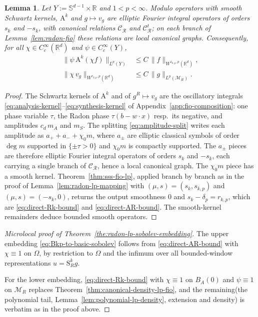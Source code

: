\documentclass[12pt]{article}
\numberwithin{equation}{section}
\newtheorem{lemma}{Lemma}[section]
\numberwithin{figure}{section}
\numberwithin{equation}{section}
\begin{document}
\begin{lemma}
\label{lem:inverse-fio-pair}
Let $Y:=\mathbb{S}^{d-1}\times\mathbb{R}$ and $1<p<\infty$.  Modulo operators with
smooth Schwartz kernels, $\mathrm{A}^k$ and $g\mapsto v_g$ are elliptic Fourier integral
operators of orders $s_k$ and $-s_k$, with canonical relations $\mathcal{C}_{\mathcal R}$
and $\mathcal{C}_{\mathcal R}^{t}$; on each branch of Lemma~\ref{lem:radon-fio} these
relations are local canonical graphs.  Consequently, for all
$\chi\in C_c^\infty(\mathbb{R}^d)$ and $\psi\in C_c^\infty(Y)$,
\begin{align}
    \|\psi\,\mathrm{A}^k(\chi f)\|_{L^p(Y)}
    &\le C\,\|f\|_{W^{s_{k,p},p}(\mathbb{R}^d)},
    \label{eq:direct-Rk-bound}\\
    \|\chi\,v_g\|_{W^{r_{k,p},p}(\mathbb{R}^d)}
    &\le C\,\|g\|_{L^p(\mathcal{M}_R)} .
    \label{eq:direct-AR-bound}
\end{align}
\end{lemma}
\begin{proof}
The Schwartz kernels of $\mathrm{A}^k$ and of $g^{R}\mapsto v_g$ are the oscillatory
integrals \eqref{eq:analysis-kernel}--\eqref{eq:synthesis-kernel} of
Appendix~\ref{app:fio-composition}: one phase variable $\tau$, the Radon phase
$\tau(b-w\cdot x)$ resp.\ its negative, and amplitudes $c_d\,m_A$ and $m_S$.  The
splitting \eqref{eq:amplitude-split} writes each amplitude as $a_++a_-+\chi_0m$, where
$a_\pm$ are elliptic classical symbols of order $\deg m$ supported in $\{\pm\tau>0\}$
and $\chi_0m$ is compactly supported.  The $a_\pm$ pieces are therefore elliptic Fourier
integral operators of orders $s_k$ and $-s_k$, each carrying a single branch of
$\mathcal{C}_{\mathcal R}$, hence a local canonical graph. The $\chi_0m$ piece has a smooth
kernel.  Theorem~\ref{thm:sss-fio-lp}, applied branch by branch as in the proof of
Lemma~\ref{lem:radon-lp-mapping} with $(\mu,s)=(s_k,s_{k,p})$ and $(\mu,s)=(-s_k,0)$,
returns the output smoothness $0$ and $s_k-\delta_p=r_{k,p}$, which are
\eqref{eq:direct-Rk-bound} and \eqref{eq:direct-AR-bound}. The smooth-kernel remainders
deduce bounded smooth operators.
\end{proof}

\begin{proof}[Microlocal proof of Theorem~\ref{the:radon-lp-sobolev-embedding}]
The upper embedding \eqref{eq:Bkp-to-basic-sobolev} follows from
\eqref{eq:direct-AR-bound} with $\chi\equiv1$ on $\Omega$, by restriction to $\Omega$
and the infimum over all bounded-window representations $u=\mathrm{S}^k_Rg$.

For the lower embedding, \eqref{eq:direct-Rk-bound} with $\chi\equiv1$ on $B_A(0)$ and
$\psi\equiv1$ on $\mathcal{M}_R$ replaces Theorem~\ref{thm:canonical-density-lp-fio}, and
the remaining(the polynomial tail, Lemma~\ref{lem:polynomial-lp-density},
extension and density) is verbatim as in the proof above.
\end{proof}
\end{document}
